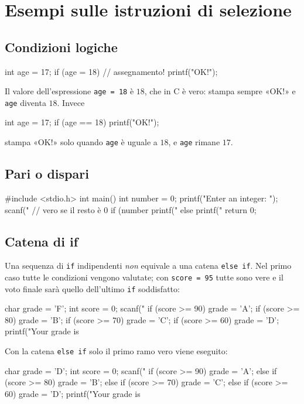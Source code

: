 \documentclass[11pt,a4paper]{article}
\begin{document}
\section{Esempi sulle istruzioni di selezione}

\subsection{Condizioni logiche}

\begin{codice}
int age = 17;
if (age = 18)           // assegnamento!
    printf("OK!");
\end{codice}
Il valore dell'espressione \lstinline|age = 18| è $18$, che in C è vero: stampa sempre «OK!» e \lstinline|age| diventa $18$. Invece
\begin{codice}
int age = 17;
if (age == 18)
    printf("OK!");
\end{codice}
stampa «OK!» solo quando \lstinline|age| è uguale a $18$, e \lstinline|age| rimane $17$.

\subsection{Pari o dispari}

\begin{codice}
#include <stdio.h>
int main() {
    int number = 0;
    printf("Enter an integer: ");
    scanf("%
    // vero se il resto è 0
    if (number %
        printf("%
    else
        printf("%
    return 0;
}
\end{codice}

\subsection{Catena di if}

Una sequenza di \lstinline|if| indipendenti \emph{non} equivale a una catena \lstinline|else if|. Nel primo caso tutte le condizioni vengono valutate; con \lstinline|score = 95| tutte sono vere e il voto finale sarà quello dell'ultimo \lstinline|if| soddisfatto:
\begin{codice}
char grade = 'F';
int score = 0;
scanf("%
if (score >= 90) grade = 'A';
if (score >= 80) grade = 'B';
if (score >= 70) grade = 'C';
if (score >= 60) grade = 'D';
printf("Your grade is %
\end{codice}
Con la catena \lstinline|else if| solo il primo ramo vero viene eseguito:
\begin{codice}
char grade = 'D';
int score = 0;
scanf("%
if (score >= 90)
    grade = 'A';
else if (score >= 80)
    grade = 'B';
else if (score >= 70)
    grade = 'C';
else if (score >= 60)
    grade = 'D';
printf("Your grade is %
\end{codice}
\end{document}
